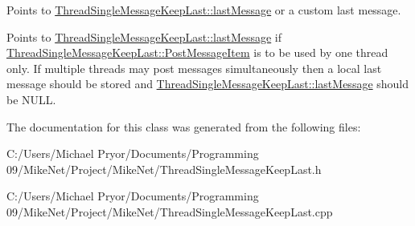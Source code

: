 Points to \hyperlink{class_thread_single_message_keep_last_ae36c3229c8538b56a7fc4740a5d58d4f}{ThreadSingleMessageKeepLast::lastMessage} or a custom last message. 

Points to \hyperlink{class_thread_single_message_keep_last_ae36c3229c8538b56a7fc4740a5d58d4f}{ThreadSingleMessageKeepLast::lastMessage} if \hyperlink{class_thread_single_message_keep_last_a27f81a79a325c68fb5257875e074924c}{ThreadSingleMessageKeepLast::PostMessageItem} is to be used by one thread only. If multiple threads may post messages simultaneously then a local last message should be stored and \hyperlink{class_thread_single_message_keep_last_ae36c3229c8538b56a7fc4740a5d58d4f}{ThreadSingleMessageKeepLast::lastMessage} should be NULL. 

The documentation for this class was generated from the following files:\begin{DoxyCompactItemize}
\item 
C:/Users/Michael Pryor/Documents/Programming 09/MikeNet/Project/MikeNet/ThreadSingleMessageKeepLast.h\item 
C:/Users/Michael Pryor/Documents/Programming 09/MikeNet/Project/MikeNet/ThreadSingleMessageKeepLast.cpp\end{DoxyCompactItemize}
